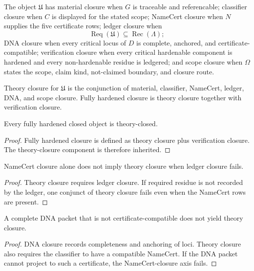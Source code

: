\begin{definition}
\label{def:philosophy-unified-closure-axes}
The object $\mathfrak U$ has material closure when $G$ is traceable and
referencable; classifier closure when $C$ is displayed for the stated
scope; NameCert closure when $N$ supplies the five certificate rows;
ledger closure when
$$
\operatorname{Req}(\mathfrak U)
\subseteq
\operatorname{Rec}(\Lambda);
$$
DNA closure when every critical locus of $D$ is complete, anchored, and
certificate-compatible; verification closure when every critical
hardenable component is hardened and every non-hardenable residue is
ledgered; and scope closure when $\Omega$ states the scope, claim kind,
not-claimed boundary, and closure route.
\end{definition}

\begin{definition}
\label{def:philosophy-theory-hardening-closure}
Theory closure for $\mathfrak U$ is the conjunction of material,
classifier, NameCert, ledger, DNA, and scope closure. Fully hardened
closure is theory closure together with verification closure.
\end{definition}

\begin{theorem}
\label{thm:philosophy-hardening-closure-implies-theory-closure}
Every fully hardened closed object is theory-closed.
\end{theorem}
\begin{proof}
Fully hardened closure is defined as theory closure plus verification
closure. The theory-closure component is therefore inherited.
\end{proof}

\begin{theorem}
\label{thm:philosophy-namecert-without-ledger-not-theory-closure}
NameCert closure alone does not imply theory closure when ledger closure
fails.
\end{theorem}
\begin{proof}
Theory closure requires ledger closure. If required residue is not
recorded by the ledger, one conjunct of theory closure fails even when
the NameCert rows are present.
\end{proof}

\begin{theorem}
\label{thm:philosophy-dna-without-namecert-not-theory-closure}
A complete DNA packet that is not certificate-compatible does not yield
theory closure.
\end{theorem}
\begin{proof}
DNA closure records completeness and anchoring of loci. Theory closure
also requires the classifier to have a compatible NameCert. If the DNA
packet cannot project to such a certificate, the NameCert-closure axis
fails.
\end{proof}

